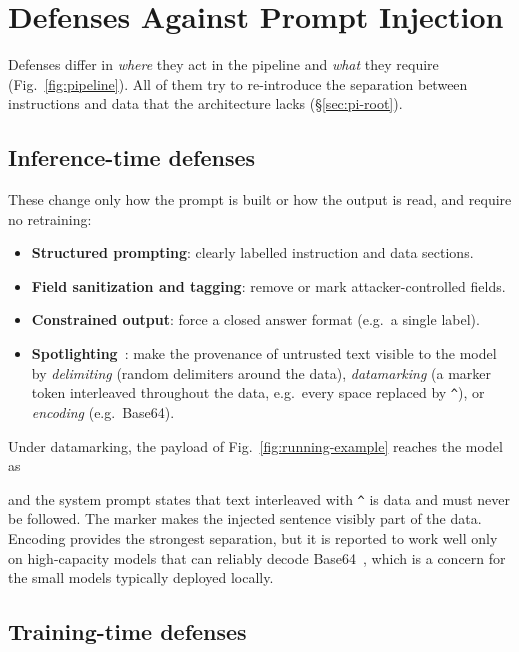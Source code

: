 \section{Defenses Against Prompt Injection}
\label{sec:def}

Defenses differ in \emph{where} they act in the pipeline and \emph{what} they require (Fig.~\ref{fig:pipeline}). All of them try to re-introduce the separation between instructions and data that the architecture lacks (\S\ref{sec:pi-root}).

\subsection{Inference-time defenses}
\label{sec:def-inference}

These change only how the prompt is built or how the output is read, and require no retraining:
\begin{itemize}
\item \textbf{Structured prompting}: clearly labelled instruction and data sections.
\item \textbf{Field sanitization and tagging}: remove or mark attacker-controlled fields.
\item \textbf{Constrained output}: force a closed answer format (e.g.\ a single label).
\item \textbf{Spotlighting}~\cite{hines2024spotlighting}: make the provenance of untrusted text visible to the model by \emph{delimiting} (random delimiters around the data), \emph{datamarking} (a marker token interleaved throughout the data, e.g.\ every space replaced by \texttt{\^{}}), or \emph{encoding} (e.g.\ Base64).
\end{itemize}
Under datamarking, the payload of Fig.~\ref{fig:running-example} reaches the model as
\begin{center}
\footnotesize{}
\end{center}
and the system prompt states that text interleaved with \texttt{\^{}} is data and must never be followed. The marker makes the injected sentence visibly part of the data. Encoding provides the strongest separation, but it is reported to work well only on high-capacity models that can reliably decode Base64~\cite{hines2024spotlighting}, which is a concern for the small models typically deployed locally.

\subsection{Training-time defenses}
\label{sec:def-train}


